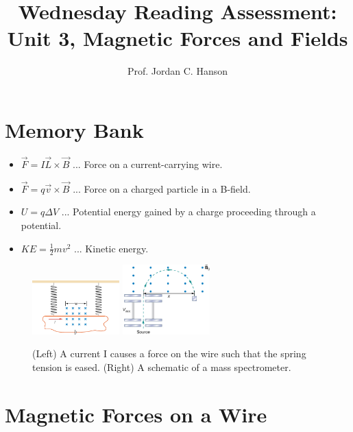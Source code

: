 \documentclass{article}
\begin{document}
\title{Wednesday Reading Assessment: Unit 3, Magnetic Forces and Fields}
\author{Prof. Jordan C. Hanson}

\maketitle

\section{Memory Bank}

\begin{itemize}
\item $\vec{F} = I\vec{L} \times \vec{B}$ ... Force on a current-carrying wire.
\item $\vec{F} = q\vec{v} \times \vec{B}$ ... Force on a charged particle in a B-field.
\item $U = q\Delta V$ ... Potential energy gained by a charge proceeding through a potential.
\item $KE = \frac{1}{2}mv^2$ ... Kinetic energy.
\end{itemize}

\begin{figure}[ht]
\centering
\includegraphics[width=0.3\textwidth]{currentBfieldSpring.jpeg} \hspace{0.2cm}
\includegraphics[width=0.3\textwidth]{massSpec.jpeg}
\caption{\label{fig:fields} (Left) A current I causes a force on the wire such that the spring tension is eased. (Right) A schematic of a mass spectrometer.}
\end{figure}

\section{Magnetic Forces on a Wire}
\end{document}
